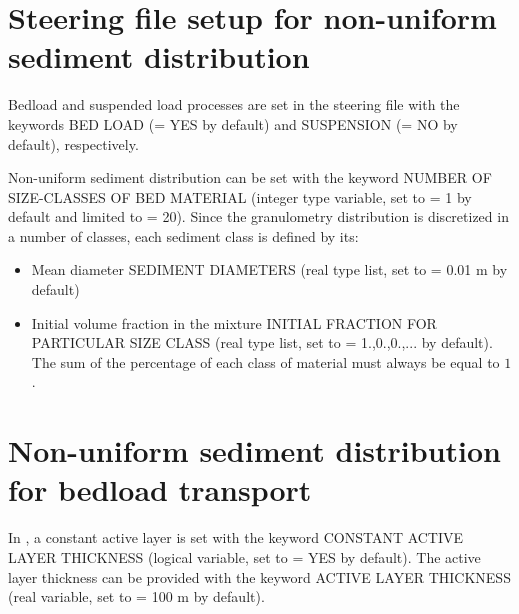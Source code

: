 
\section{Steering file setup for non-uniform sediment distribution}
Bedload and suspended load processes are set in the steering file with the keywords 
{\ttfamily BED LOAD} ({\ttfamily = YES} by default) and {\ttfamily SUSPENSION} ({\ttfamily = NO} by default), respectively.

Non-uniform sediment distribution can be set with the keyword {\ttfamily NUMBER OF SIZE-CLASSES OF BED MATERIAL} (integer type variable, set to {\ttfamily = 1} by default and limited to {\ttfamily = 20}).  Since the granulometry distribution is discretized in a number of classes, each sediment class is defined by its:
\begin{itemize}
\item Mean diameter {\ttfamily SEDIMENT DIAMETERS} (real type list, set to {\ttfamily = 0.01} m by default)
\item Initial volume fraction in the mixture {\ttfamily INITIAL FRACTION FOR PARTICULAR SIZE CLASS} (real type list, set to {\ttfamily = 1.,0.,0.,...} by default). The sum of the percentage of each class of material must always be equal to $1$.

\end{itemize}

\section{Non-uniform sediment distribution for bedload transport}
In \sisyphe{}, a constant active layer is set with the keyword {\ttfamily CONSTANT ACTIVE LAYER THICKNESS} (logical variable, set to {\ttfamily = YES} by default). The active layer thickness can be provided with the keyword {\ttfamily ACTIVE LAYER THICKNESS} (real variable, set to {\ttfamily = 100} m by default). %


